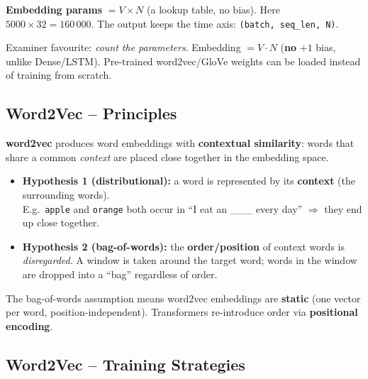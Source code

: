 \documentclass[10pt,a4paper]{article}
\begin{document}
	\begin{importantbox}
		\textbf{Embedding params} $= V \times N$ (a lookup table, no bias). Here $5000\times 32 = 160\,000$. The output keeps the time axis: \texttt{(batch, seq\_len, N)}.
	\end{importantbox}

	\begin{examtipbox}
		Examiner favourite: \emph{count the parameters}. Embedding $= V\cdot N$ (\textbf{no} $+1$ bias, unlike Dense/LSTM). Pre-trained word2vec/GloVe weights can be loaded instead of training from scratch.
	\end{examtipbox}

	\subsection{Word2Vec -- Principles}

	\begin{definitionbox}
		\textbf{word2vec} produces word embeddings with \textbf{contextual similarity}: words that share a common \emph{context} are placed close together in the embedding space.
	\end{definitionbox}

	\begin{itemize}[leftmargin=*]
		\item \textbf{Hypothesis 1 (distributional):} a word is represented by its \textbf{context} (the surrounding words). \\
		E.g.\ \texttt{apple} and \texttt{orange} both occur in ``I eat an \_\_\_ every day'' $\Rightarrow$ they end up close together.
		\item \textbf{Hypothesis 2 (bag-of-words):} the \textbf{order/position} of context words is \emph{disregarded}. A window is taken around the target word; words in the window are dropped into a ``bag'' regardless of order.
	\end{itemize}

	\begin{importantbox}
		The bag-of-words assumption means word2vec embeddings are \textbf{static} (one vector per word, position-independent). Transformers re-introduce order via \textbf{positional encoding}.
	\end{importantbox}

	\subsection{Word2Vec -- Training Strategies}
\end{document}
